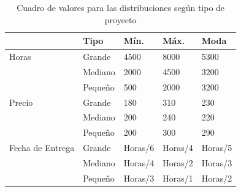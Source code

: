 \begin{table}[H]

\begin{center}

\begin{tabular}{|l|l|l|l|l|}
\hline
                    & Tipo      & Mín.    & Máx.    & Moda\\
\hline
    Horas           & Grande    & 4500    & 8000    & 5300\\
\hline
                    & Mediano   & 2000    & 4500    & 3200\\
\hline
                    & Pequeño   & 500     & 2000    & 3200\\
\hline
    Precio          & Grande    & 180     & 310     & 230\\
\hline
                    & Mediano   & 200     & 240     & 220\\
\hline
                    & Pequeño   & 200     & 300     & 290\\
\hline
    Fecha de Entrega& Grande    & Horas/6 & Horas/4 & Horas/5\\
\hline
                    & Mediano   & Horas/4 & Horas/2 & Horas/3\\
\hline
                    & Pequeño   & Horas/3 & Horas/1 & Horas/2\\
\hline
\end{tabular}

\end{center}

\caption{Cuadro de valores para las distribuciones según tipo de proyecto}
\label{tab:va}


\end{table}

